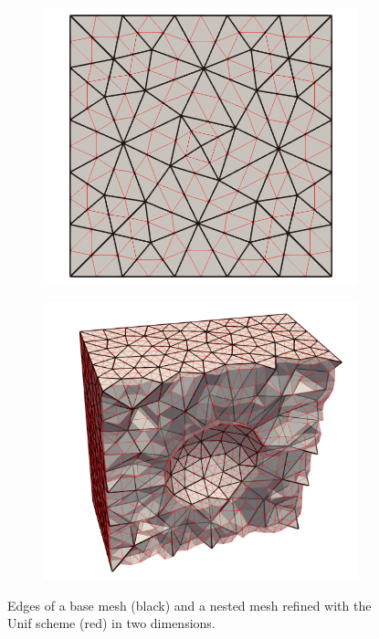 \begin{figure}[ht!]
\centering
\begin{subfigure}{.5\textwidth}
\centering
\includegraphics[width=.9\linewidth]{img/refine_unif_mesh.png}
\end{subfigure}%
\begin{subfigure}{.5\textwidth}
\centering
\includegraphics[width=.99\linewidth]{img/refine_unif_mesh_3D.png}
\end{subfigure}
\caption{Edges of a base mesh (black) and a nested mesh refined
with the Unif scheme (red) in two dimensions.}
\label{fig:unif_mesh}
\end{figure}

